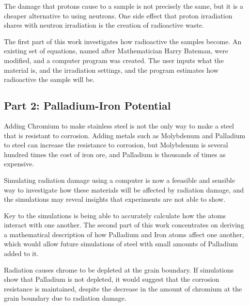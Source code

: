 The damage that protons cause to a sample is not precisely the same, but it is a cheaper alternative to using neutrons.  One side effect that proton irradiation shares with neutron irradiation is the creation of radioactive waste.  

The first part of this work investigates how radioactive the samples become.  An existing set of equations, named after Mathematician Harry Bateman, were modified, and a computer program was created.  The user inputs what the material is, and the irradiation settings, and the program estimates how radioactive the sample will be.


\subsection{Part 2: Palladium-Iron Potential}

Adding Chromium to make stainless steel is not the only way to make a steel that is resistant to corrosion.  Adding metals such as Molybdenum and Palladium to steel can increase the resistance to corrosion, but Molybdenum is several hundred times the cost of iron ore, and Palladium is thousands of times as expensive.

Simulating radiation damage using a computer is now a feeasible and sensible way to investigate how these materials will be affected by radiation damage, and the simulations may reveal insights that experiments are not able to show.

Key to the simulations is being able to accurately calculate how the atoms interact with one another.  The second part of this work concentrates on deriving a mathematical description of how Palladium and Iron atoms affect one another, which would allow future simulations of steel with small amounts of Palladium added to it.

Radiation causes chrome to be depleted at the grain boundary.  If simulations show that Palladium is not depleted, it would suggest that the corrosion resistance is maintained, despite the decrease in the amount of chromium at the grain boundary due to radiation damage.








